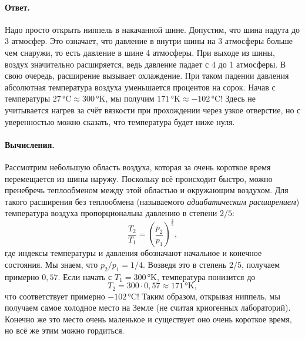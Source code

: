 \paragraph{Ответ.}
Надо просто открыть ниппель в накачанной шине.
Допустим, что шина надута до 3 атмосфер.
Это означает, что давление в внутри шины на 3 атмосферы больше чем снаружи, то есть давление в шине 4 атмосферы.
При выходе из шины, воздух значительно расширяется, ведь давление падает с 4 до 1 атмосферы.
В свою очередь, расширение вызывает охлаждение.
При таком падении давления абсолютная температура воздуха уменьшается процентов на сорок.
Начав с температуры $27 \,\text{°C} \approx 300\, \text{°K}$, мы получим $171 \,\text{°K} \approx -102\, \text{°C}$!
Здесь не учитывается нагрев за счёт вязкости при прохождении через узкое отверстие, но с уверенностью можно сказать, что температура будет ниже нуля.

\paragraph{Вычисления.}
Рассмотрим небольшую область воздуха, которая за очень короткое время перемещается из шины наружу.
Поскольку всё происходит быстро, можно пренебречь теплообменом между этой областью и окружающим воздухом.
Для такого расширения без теплообмена (называемого \emph{адиабатическим расширением}) температура воздуха пропорциональна давлению в степени $2/5$:
\[\frac{T_2}{T_1}=\left(\frac{p_2}{p_1}\right)^{\tfrac{2}{5}},\]
где индексы температуры и давления обозначают начальное и конечное состояния.
Мы знаем, что $p_2/p_1=1/4$.
Возведя это в степень $2/5$, получаем примерно $0{,}57$.
Если начать с $T_1=300 \,$°K, температура понизится до
\[T_2=300 \cdot 0{,}57 \approx 171 \,\text{°K},\]
что соответствует примерно $-102\, \text{°C}$!
Таким образом, открывая ниппель, мы получаем самое холодное место на Земле (не считая криогенных лабораторий).
Конечно же это место очень маленькое и существует оно очень короткое время, но всё же этим можно гордиться.
